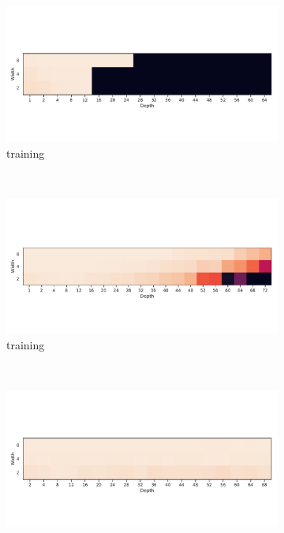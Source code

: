 \begin{figure}
  \centering
    \begin{subfigure}[b]{0.3\textwidth}
        \includegraphics[width=\textwidth]{img/mnist_grid/acc-relu-ks-3x3-bs-1024.pdf}
        \caption{\ReLU training}
        \label{fig:mnist_grid_relu}
    \end{subfigure}
    ~ %
    \centering
    \begin{subfigure}[b]{0.3\textwidth}
        \includegraphics[width=\textwidth]{img/mnist_grid/acc-relu-bn-ks-3x3-bs-1024.pdf}
        \caption{\ReLUBN training}
        \label{fig:mnist_grid_relubn}
    \end{subfigure}
    ~ %
    \centering
    \begin{subfigure}[b]{0.3\textwidth}
        \includegraphics[width=\textwidth]{img/mnist_grid/acc-sep-up-1e-08-ks-3x3-bs-1024.pdf}

\end{subfigure}
\end{figure}
